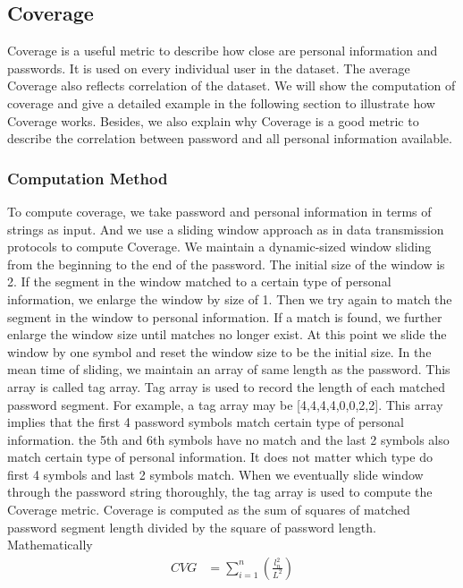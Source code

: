 \documentclass{sig-alternate}
\begin{document}
\subsection{Coverage}
\label{coverage}

Coverage is a useful metric to describe how close are personal information and passwords. It is used on every individual user in the dataset. The average Coverage also reflects correlation of the dataset. We will show the computation of coverage and give a detailed example in the following section to illustrate how Coverage works. Besides, we also explain why Coverage is a good metric to describe the correlation between password and all personal information available. 
\subsubsection{Computation Method}
\label{computationmethod}
To compute coverage, we take password and personal information in terms of strings as input. And we use a sliding window approach as in data transmission protocols to compute Coverage. We maintain a dynamic-sized window sliding from the beginning to the end of the password. The initial size of the window is 2. If the segment in the window matched to a certain type of personal information, we enlarge the window by size of 1. Then we try again to match the segment in the window to personal information. If a match is found, we further enlarge the window size until matches no longer exist. At this point we slide the window by one symbol and reset the window size to be the initial size. In the mean time of sliding, we maintain an array of same length as the password. This array is called tag array. Tag array is used to record the length of each matched password segment. For example, a tag array may be [4,4,4,4,0,0,2,2]. This array implies that the first 4 password symbols match certain type of personal information. the 5th and 6th symbols have no match and the last 2 symbols also match certain type of personal information. It does not matter which type do first 4 symbols and last 2 symbols match. When we eventually slide window through the password string thoroughly, the tag array is used to compute the Coverage metric. Coverage is computed as the sum of squares of matched password segment length divided by the square of password length. Mathematically
\begin{equation} \label{eq1}
\begin{split}
CVG & = \sum_{i=1}^n (\frac{l_n^2}{L^2}) \\
\end{split}
\end{equation}
\end{document}

